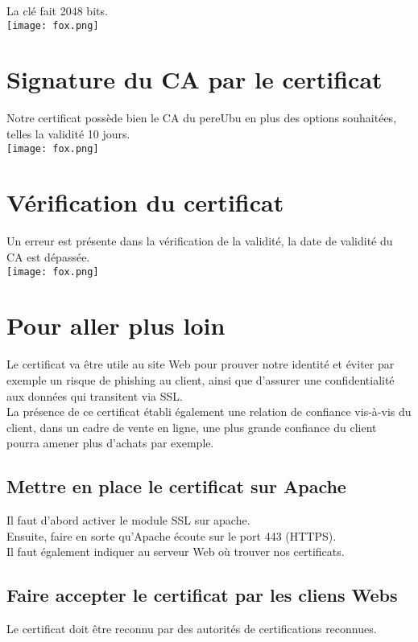 \documentclass[a4paper,10pt,final,fleqn]{article}
\begin{document}
		La clé fait 2048 bits.\\

		\texttt{[image: fox.png]}

	\section{Signature du CA par le certificat}

		Notre certificat possède bien le CA du pereUbu en plus des options souhaitées, telles la validité 10 jours.\\

		\texttt{[image: fox.png]}

	\section{Vérification du certificat}

		Un erreur est présente dans la vérification de la validité, la date de validité du CA est dépassée.\\

		\texttt{[image: fox.png]}

	\section{Pour aller plus loin}

		Le certificat va être utile au site Web pour prouver notre identité et éviter par exemple un risque de phishing au client, ainsi que d'assurer une confidentialité aux données qui transitent via SSL.\\
		La présence de ce certificat établi également une relation de confiance vis-à-vis du client, dans un cadre de vente en ligne, une plus grande confiance du client pourra amener plus d'achats par exemple.\\

		\subsection{Mettre en place le certificat sur Apache}

			Il faut d'abord activer le module SSL sur apache.\\
			Ensuite, faire en sorte qu'Apache écoute sur le port 443 (HTTPS).\\

			Il faut également indiquer au serveur Web où trouver nos certificats.

		\subsection{Faire accepter le certificat par les cliens Webs}

			Le certificat doit être reconnu par des autorités de certifications reconnues.\\
		
\end{document}
